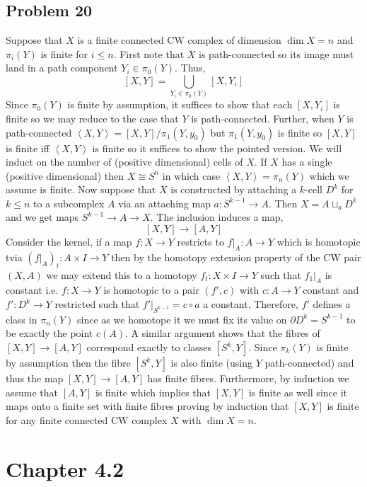\documentclass[12pt]{extarticle}
\begin{document}
\subsection{Problem 20}

Suppose that $X$ is a finite connected CW complex of dimension $\dim{X} = n$ and $\pi_i(Y)$ is finite for $i \le n$. First note that $X$ is path-connected so its image must land in a path component $Y_i \in \pi_0(Y)$. Thus,
\[ [X, Y] = \bigcup_{Y_i \in \pi_0(Y)} [X, Y_i] \]
Since $\pi_0(Y)$ is finite by assumption, it suffices to show that each $[X, Y_i]$ is finite so we may reduce to the case that $Y$ is path-connected. Further, when $Y$ is path-connected $\left< X, Y \right> = [X, Y] / \pi_1(Y, y_0)$ but $\pi_1(Y, y_0)$ is finite so $[X, Y]$ is finite iff $\left< X, Y \right>$ is finite so it suffices to show the pointed version. We will induct on the number of (positive dimensional) cells of $X$. If $X$ has a single (positive dimensional) then $X \cong S^n$ in which case $\left< X, Y \right> = \pi_n(Y)$ which we assume is finite. Now suppose that $X$ is constructed by attaching a $k$-cell  $D^k$ for $k \le n$ to a subcomplex $A$ via an attaching map $a : S^{k-1} \to A$. Then $X = A \sqcup_a D^k$ and we get maps $S^{k-1} \to A \to X$. The inclusion induces a map,
\[ [X, Y] \to [A, Y] \]
Consider the kernel, if a map $f: X \to Y$ restricts to $f|_A : A \to Y$ which is homotopic tvia $(f|_A)_t : A \times I \to Y$ then by the homotopy extension property of the CW pair $(X, A)$ we may extend this to a homotopy $f_t : X \times I \to Y$ such that $f_1 |_A$ is constant i.e. $f : X \to Y$ is homotopic to a pair $(f', c)$ with $c : A \to Y$ constant and $f' : D^k \to Y$ restricted such that $f'|_{S^{k-1}} = c \circ a$ a constant. Therefore, $f'$ defines a class in $\pi_n(Y)$ since as we homotope it we must fix its value on $\partial D^{k} = S^{k-1}$ to be exactly the point $c(A)$. A similar argument shows that the fibres of $[X, Y] \to [A, Y]$ correspond exactly to classes $[S^k, Y]$. Since $\pi_k(Y)$ is finite by assumption then the fibre $[S^k, Y]$ is also finite (using $Y$ path-connected) and thus the map $[X, Y] \to [A, Y]$ has finite fibres. Furthermore, by induction we assume that $[A, Y]$ is finite which implies that $[X, Y]$ is finite as well since it maps onto a finite set with finite fibres proving by induction that $[X, Y]$ is finite for any finite connected CW complex $X$ with $\dim{X} = n$.  

\section{Chapter 4.2}
\end{document}
